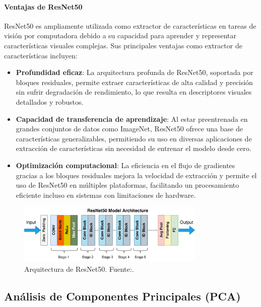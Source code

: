\paragraph{Ventajas de ResNet50}
ResNet50 es ampliamente utilizada como extractor de características en tareas de visión por computadora debido a su capacidad para aprender y representar características visuales complejas. Sus principales ventajas como extractor de características incluyen:

\begin{itemize}
    \item \textbf{Profundidad eficaz}: La arquitectura profunda de ResNet50, soportada por bloques residuales, permite extraer características de alta calidad y precisión sin sufrir degradación de rendimiento, lo que resulta en descriptores visuales detallados y robustos.
    \item \textbf{Capacidad de transferencia de aprendizaje}: Al estar preentrenada en grandes conjuntos de datos como ImageNet, ResNet50 ofrece una base de características generalizables, permitiendo su uso en diversas aplicaciones de extracción de características sin necesidad de entrenar el modelo desde cero.
    \item \textbf{Optimización computacional}: La eficiencia en el flujo de gradientes gracias a los bloques residuales mejora la velocidad de extracción y permite el uso de ResNet50 en múltiples plataformas, facilitando un procesamiento eficiente incluso en sistemas con limitaciones de hardware.
\end{itemize}

\begin{figure}[H]
	\centering
	\includegraphics[width=0.80\textwidth]{2/figures/ResNet.png}
	\caption{Arquitectura de ResNet50. Fuente:\cite {Mukherjee2022}.}

	\label{1:fig}
\end{figure}

\subsection{Análisis de Componentes Principales (PCA)}

